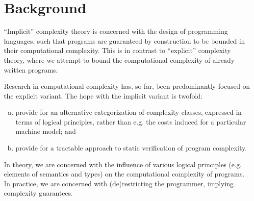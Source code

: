 
\section{Background}


 ``Implicit'' complexity theory is concerned with the design of programming
languages, such that programs are guaranteed by construction to be bounded in
their computational complexity. This is in contrast to ``explicit'' complexity
theory, where we attempt to bound the computational complexity of already
written programs.

Research in computational complexity has, so far, been predominantly focused on
the explicit variant. The hope with the implicit variant is
twofold\cite{baillot-et-al-2006}:

\begin{enumerate}[(a)]

\item provide for an alternative categorization of complexity classes,
expressed in terms of logical principles, rather than e.g. the costs induced
for a particular machine model; and

\item provide for a tractable approach to static verification of program
complexity.

\end{enumerate}

In theory, we are concerned with the influence of various logical principles
(e.g. elements of semantics and types) on the computational complexity of
programs. In practice, we are concerned with (de)restricting the programmer,
implying complexity guarantees.
